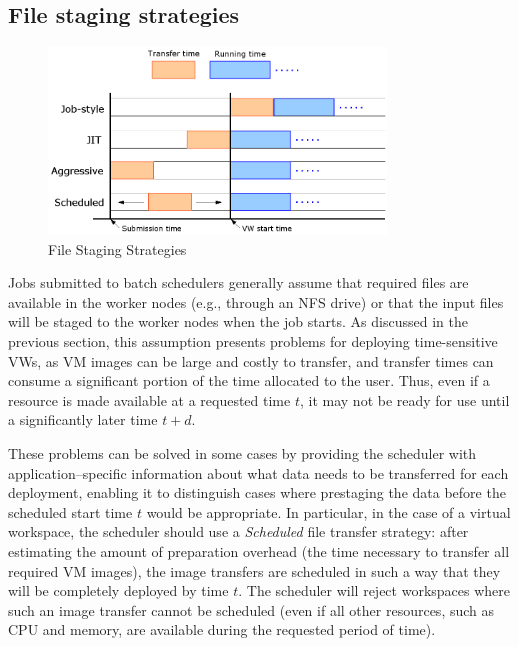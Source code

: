 \documentclass[singlespace]{ccw_chithesis}
\begin{document}
\subsection{File staging strategies}
\label{sec:filestaging}

\begin{figure}
  \begin{center}
    \includegraphics[width=0.8\textwidth]{figures/filetransfer.png}
    \caption{File Staging Strategies}
	\label{fig:filetransfer}
  \end{center}
\end{figure}

Jobs submitted to batch schedulers generally assume that required files are available in the worker nodes (e.g., through an NFS drive) or that the input files will be staged to the worker nodes when the job starts. As discussed in the previous section, this assumption presents problems for deploying time{}-sensitive VWs, as VM images can be large and costly to transfer, and transfer times can consume a significant portion of the time allocated to the user. Thus, even if a resource is made available at a requested time $t$, it may not be ready for use until a significantly later time $t+d$.

These problems can be solved in some cases by providing the scheduler with application--specific information about what data needs to be transferred for each deployment, enabling it to distinguish cases where prestaging the data before the scheduled start time $t$ would be appropriate. In particular, in the case of a virtual workspace, the scheduler should use a \emph{Scheduled} file transfer strategy: after estimating the amount of preparation overhead (the time necessary to transfer all required VM images), the image transfers are scheduled in such a way that they will be completely deployed by time $t$. The scheduler will reject workspaces where such an image transfer cannot be scheduled (even if all other resources, such as CPU and memory, are available during the requested period of time). 
\end{document}
